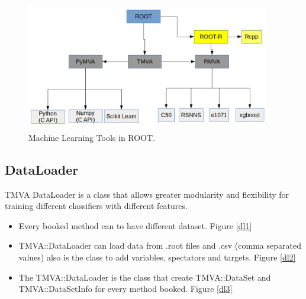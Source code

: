 \documentclass[a4paper]{jpconf}
\begin{document}
\begin{figure}[h]
\centering
\includegraphics[width=25pc]{img/tmva.png}\caption{\label{tmva:label} Machine Learning Tools in ROOT.}
\end{figure}


\subsection{DataLoader}

TMVA DataLoader is a class that allows greater
modularity and flexibility for training different classifiers
with different features.

\begin{itemize}  
\item Every booked method can to have different dataset. Figure \ref{dl1}
\item TMVA::DataLoader can load data from .root files and .csv (comma separated values) also is the class to add variables, spectators and targets. Figure \ref{dl2}
\item The TMVA::DataLoader is the class that create TMVA::DataSet and TMVA::DataSetInfo for every method booked. Figure \ref{dl3}
\end{itemize}
\end{document}

